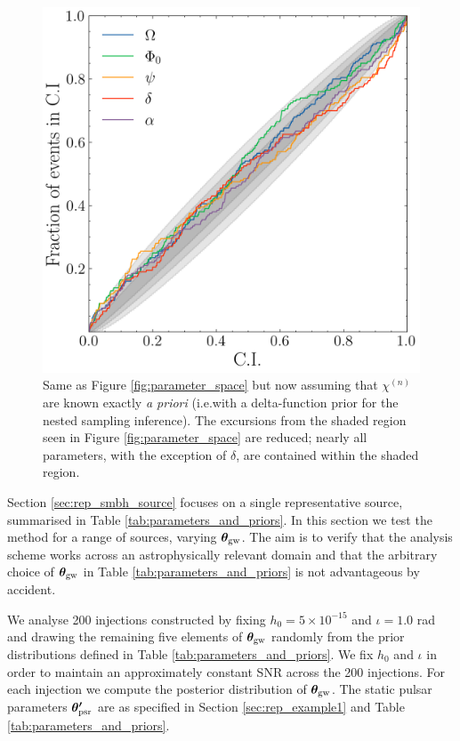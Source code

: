 \documentclass[fleqn,usenatbib,useAMS]{mnras}
\begin{document}
\begin{figure}
	\centering
	\includegraphics[width=\columnwidth]{images/pp_plot_canonical_nochi}
	\caption{Same as Figure \ref{fig:parameter_space} but now assuming that $\chi^{(n)}$ are known exactly \textit{a priori} (i.e.with a delta-function prior for the nested sampling inference). The excursions from the shaded region seen in Figure  \ref{fig:parameter_space} are reduced; nearly all parameters, with the exception of $\delta$, are contained within the shaded region. }
	\label{fig:parameter_space2}
\end{figure}

Section \ref{sec:rep_smbh_source} focuses on a single representative source, summarised in Table \ref{tab:parameters_and_priors}. In this section we test the method for a range of sources, varying $\boldsymbol{\theta}_{\rm gw}$. The aim is to verify that the analysis scheme works across an astrophysically relevant domain and that the arbitrary choice of $\boldsymbol{\theta}_{\rm gw}$ in Table \ref{tab:parameters_and_priors} is not advantageous by accident. \newline 

We analyse 200 injections constructed by fixing $h_0 = 5 \times 10^{-15}$ and $\iota =1.0$ rad and drawing the remaining five elements of $\boldsymbol{\theta}_{\rm gw}$ randomly from the prior distributions defined in Table \ref{tab:parameters_and_priors}. We fix $h_0$ and $\iota$ in order to maintain an approximately constant SNR across the 200 injections. For each injection we compute the posterior distribution of ${\boldsymbol{\theta}}_{\rm gw}$. The static pulsar parameters $\boldsymbol{\theta'}_{\rm psr}$ are as specified in Section \ref{sec:rep_example1} and Table  \ref{tab:parameters_and_priors}. \newline 
\end{document}
